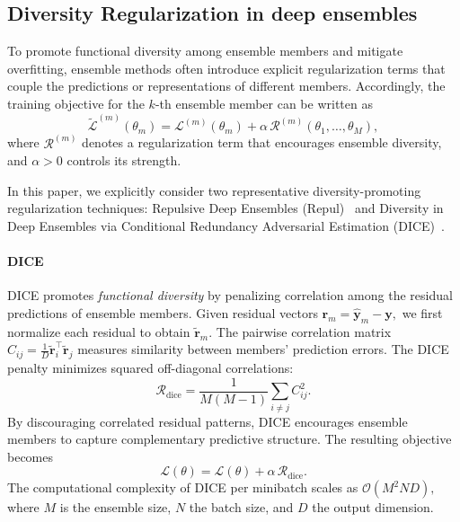 \documentclass[sigconf]{acmart}
\begin{document}
\subsection{Diversity Regularization in deep ensembles}
\label{subsec:regularization prelimnary}

To promote functional diversity among ensemble members and mitigate overfitting, ensemble methods often introduce explicit regularization terms that couple the predictions or representations of different members.
Accordingly, the training objective for the $k$-th ensemble member can be written as
\begin{equation}
\label{eq:reg_objective}
\tilde{\mathcal{L}}^{(m)}(\theta_m)
=
\mathcal{L}^{(m)}(\theta_m)
+
\alpha \, \mathcal{R}^{(m)}(\theta_1, \dots, \theta_M),
\end{equation}
where $\mathcal{R}^{(m)}$ denotes a regularization term that encourages ensemble diversity, and $\alpha > 0$ controls its strength.

In this paper, we explicitly consider two representative diversity-promoting regularization techniques: Repulsive Deep Ensembles (Repul)~\citep{dangelo2021repulsive} and Diversity in Deep Ensembles via Conditional Redundancy Adversarial Estimation (DICE)~\citep{rame2021dice}.

\paragraph{DICE}
DICE promotes \emph{functional diversity} by penalizing correlation among the residual predictions of ensemble members.
Given residual vectors
$
\mathbf{r}_m = \hat{\mathbf{y}}_m - \mathbf{y},
$
we first normalize each residual to obtain $\tilde{\mathbf{r}}_m$. The pairwise correlation matrix
$
C_{ij} = \frac{1}{D}\tilde{\mathbf{r}}_i^\top \tilde{\mathbf{r}}_j
$
measures similarity between members' prediction errors. The DICE penalty minimizes squared off-diagonal correlations:
\[
\mathcal{R}_{\text{dice}}
=
\frac{1}{M(M-1)}
\sum_{i\neq j} C_{ij}^2.
\]
By discouraging correlated residual patterns, DICE encourages ensemble members to capture complementary predictive structure. The resulting objective becomes
\[
{\mathcal{L}}(\theta)
=
\mathcal{L}(\theta)
+
\alpha \, \mathcal{R}_{\text{dice}}.
\]
The computational complexity of DICE per minibatch scales as
$
\mathcal{O}(M^2 N D),
$
where $M$ is the ensemble size, $N$ the batch size, and $D$ the output dimension.
\end{document}
